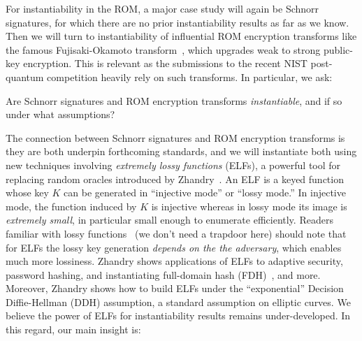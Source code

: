 
\iffalse
For instantiability in the ROM, a major case study will again be Schnorr signatures, for which there are no prior instantiability results as far as we know. Then we will turn to instantiability of influential ROM encryption transforms like the famous Fujisaki-Okamoto transform~\cite{}, which upgrades weak to strong public-key encryption. This is relevant as the submissions to the recent NIST post-quantum competition heavily rely on such  transforms. In particular, we ask:

\begin{ques}
    Are Schnorr signatures and ROM encryption transforms \emph{instantiable},  and if so under what assumptions?
\end{ques}

The connection between Schnorr signatures and ROM encryption transforms is they are both underpin forthcoming standards, and we will instantiate both using new techniques involving    \emph{extremely lossy functions} (ELFs), a powerful tool for replacing random oracles introduced by Zhandry~\cite{C:Zhandry16}. An ELF is a keyed function  whose key $K$ can be generated in ``injective mode'' or ``lossy mode.''  In injective mode, the function induced by $K$ is injective whereas in lossy mode its image is \emph{extremely small}, in particular small enough to enumerate efficiently. 
Readers familiar with lossy functions~\cite{JACM:PeiWat11} (we don't need a trapdoor here) should note that for ELFs the lossy key generation \emph{depends on the the adversary}, which enables  much more lossiness. Zhandry shows  applications of ELFs to  adaptive security, password hashing, and instantiating full-domain hash  (FDH)~\cite{CCS:BelRog93}, and more. Moreover, Zhandry shows how to build ELFs under the ``exponential'' Decision Diffie-Hellman (DDH) assumption, a standard assumption on elliptic curves. We believe the power of ELFs for instantiability results remains under-developed. In this regard, our main insight is:



